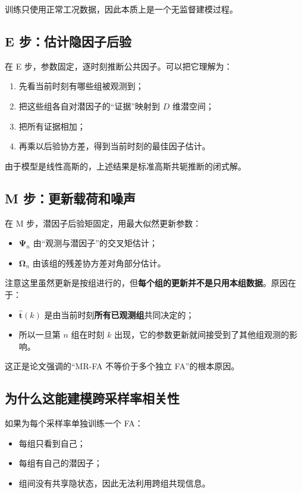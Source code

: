 \documentclass[UTF8]{ctexart}
\begin{document}
训练只使用正常工况数据，因此本质上是一个无监督建模过程。

\subsection{E 步：估计隐因子后验}

在 E 步，参数固定，逐时刻推断公共因子。可以把它理解为：
\begin{enumerate}
    \item 先看当前时刻有哪些组被观测到；
    \item 把这些组各自对潜因子的“证据”映射到 $D$ 维潜空间；
    \item 把所有证据相加；
    \item 再乘以后验协方差，得到当前时刻的最佳因子估计。
\end{enumerate}

由于模型是线性高斯的，上述结果是标准高斯共轭推断的闭式解。

\subsection{M 步：更新载荷和噪声}

在 M 步，潜因子后验矩固定，用最大似然更新参数：
\begin{itemize}
    \item $\bm{\Psi}_n$ 由“观测与潜因子”的交叉矩估计；
    \item $\bm{\Omega}_n$ 由该组的残差协方差对角部分估计。
\end{itemize}

注意这里虽然更新是按组进行的，但\textbf{每个组的更新并不是只用本组数据}。原因在于：
\begin{itemize}
    \item $\hat{\bm{t}}(k)$ 是由当前时刻\textbf{所有已观测组}共同决定的；
    \item 所以一旦第 $n$ 组在时刻 $k$ 出现，它的参数更新就间接受到了其他组观测的影响。
\end{itemize}

这正是论文强调的“MR-FA 不等价于多个独立 FA”的根本原因。

\subsection{为什么这能建模跨采样率相关性}

如果为每个采样率单独训练一个 FA：
\begin{itemize}
    \item 每组只看到自己；
    \item 每组有自己的潜因子；
    \item 组间没有共享隐状态，因此无法利用跨组共现信息。
\end{itemize}
\end{document}
